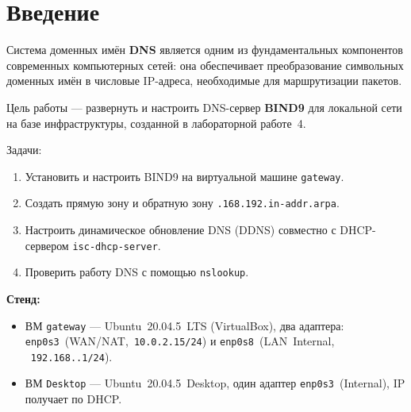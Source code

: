 \chapter*{Введение}
\label{ch:intro}

Система доменных имён \textbf{DNS} является одним из фундаментальных компонентов
современных компьютерных сетей: она обеспечивает преобразование символьных
доменных имён в числовые IP-адреса, необходимые для маршрутизации пакетов.

Цель работы — развернуть и настроить DNS-сервер \textbf{BIND9} для
локальной сети на базе инфраструктуры, созданной в лабораторной работе~4.

Задачи:
\begin{enumerate}
  \item Установить и настроить BIND9 на виртуальной машине \texttt{gateway}.
  \item Создать прямую зону \texttt{\cfgDomain} и обратную зону
        \texttt{\cfgLabStudentN.168.192.in-addr.arpa}.
  \item Настроить динамическое обновление DNS (DDNS) совместно с
        DHCP-сервером \texttt{isc-dhcp-server}.
  \item Проверить работу DNS с помощью \texttt{nslookup}.
\end{enumerate}

\textbf{Стенд:}
\begin{itemize}
  \item ВМ \texttt{gateway} — Ubuntu~20.04.5~LTS (VirtualBox),
        два адаптера: \texttt{enp0s3}~(WAN/NAT,~\texttt{10.0.2.15/24})
        и \texttt{enp0s8}~(LAN~Internal,\\~\texttt{192.168.\cfgLabStudentN.1/24}).
  \item ВМ \texttt{Desktop} — Ubuntu~20.04.5~Desktop, один адаптер
        \texttt{enp0s3}~(Internal), IP получает по DHCP.
\end{itemize}

\endinput
